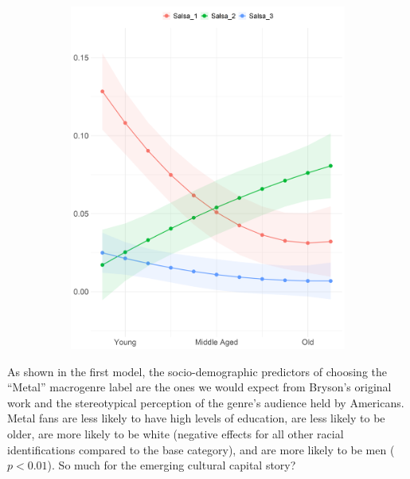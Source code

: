 \documentclass[a4paper,12pt]{extarticle}
\begin{document}
\begin{figure}[t!]
\begin{subfigure}[b]{0.45\textwidth}
        \includegraphics[width=1.0\textwidth]{Plots/Micro/micro-by-age-salsa.png}
        \caption{}
        \label{fig:age-salsa}
    \end{subfigure}
\end{figure}

As shown in the first model, the socio-demographic predictors of choosing the ``Metal'' macrogenre label are the ones we would expect from Bryson's original work and the stereotypical perception of the genre's audience held by Americans. Metal fans are less likely to have high levels of education, are less likely to be older, are more likely to be white (negative effects for all other racial identifications compared to the base category), and are more likely to be men ($p<0.01$). So much for the emerging cultural capital story?
\end{document}
